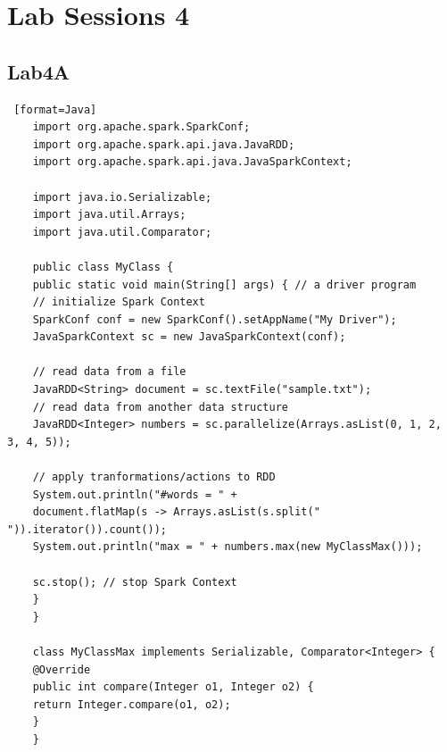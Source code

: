 \documentclass[11pt, letterpaper]{article}
\begin{document}
	
	\section {Lab Sessions 4}
	
	\subsection{Lab4A}
	\begin{lstlisting} [format=Java]
	import org.apache.spark.SparkConf;
	import org.apache.spark.api.java.JavaRDD;
	import org.apache.spark.api.java.JavaSparkContext;
	
	import java.io.Serializable;
	import java.util.Arrays;
	import java.util.Comparator;
	
	public class MyClass {
	public static void main(String[] args) { // a driver program
	// initialize Spark Context
	SparkConf conf = new SparkConf().setAppName("My Driver");
	JavaSparkContext sc = new JavaSparkContext(conf);
	
	// read data from a file
	JavaRDD<String> document = sc.textFile("sample.txt");
	// read data from another data structure
	JavaRDD<Integer> numbers = sc.parallelize(Arrays.asList(0, 1, 2, 3, 4, 5));
	
	// apply tranformations/actions to RDD
	System.out.println("#words = " +
	document.flatMap(s -> Arrays.asList(s.split(" ")).iterator()).count());
	System.out.println("max = " + numbers.max(new MyClassMax()));
	
	sc.stop(); // stop Spark Context
	}
	}
	
	class MyClassMax implements Serializable, Comparator<Integer> {
	@Override
	public int compare(Integer o1, Integer o2) {
	return Integer.compare(o1, o2);
	}
	}
	\end{lstlisting}
	
\end{document}
